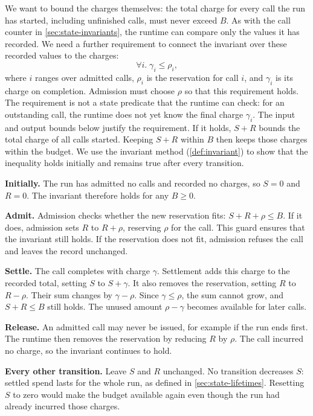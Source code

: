 We want to bound the charges themselves: the total charge for every call the run has started,
including unfinished calls, must never exceed $B$. As with the call counter in
\cref{sec:state-invariants}, the runtime can compare only the values it has recorded. We need a
further requirement to connect the invariant over these recorded values to the charges:
\[
  \forall i.\; \gamma_i \leq \rho_i ,
\]
where $i$ ranges over admitted calls, $\rho_i$ is the reservation for call $i$, and $\gamma_i$ is
its charge on completion. Admission must choose $\rho$ so that this requirement holds. The
requirement is not a state predicate that the runtime can check: for an outstanding call, the
runtime does not yet know the final charge $\gamma_i$. The input and output bounds below justify
the requirement. If it holds, $S + R$ bounds the total charge of all calls started. Keeping
$S + R$ within $B$ then keeps those charges within the budget. We use the invariant method
(\cref{def:invariant}) to show that the inequality holds initially and remains true after every
transition.

\bi

\item \textbf{Initially.} The run has admitted no calls and recorded no charges, so $S = 0$ and
$R = 0$. The invariant therefore holds for any $B \geq 0$.

\item \textbf{Admit.} Admission checks whether the new reservation fits: $S + R + \rho \leq B$.
If it does, admission sets $R$ to $R + \rho$, reserving $\rho$ for the call. This guard ensures
that the invariant still holds. If the reservation does not fit, admission refuses the call and
leaves the record unchanged.

\item \textbf{Settle.} The call completes with charge $\gamma$. Settlement adds this charge to
the recorded total, setting $S$ to $S + \gamma$. It also removes the reservation, setting $R$ to
$R - \rho$. Their sum changes by $\gamma - \rho$. Since $\gamma \leq \rho$, the sum cannot grow,
and $S + R \leq B$ still holds. The unused amount $\rho - \gamma$ becomes available for later
calls.

\item \textbf{Release.} An admitted call may never be issued, for example if the run ends first.
The runtime then removes the reservation by reducing $R$ by $\rho$. The call incurred no charge,
so the invariant continues to hold.

\item \textbf{Every other transition.} Leave $S$ and $R$ unchanged. No transition decreases $S$:
settled spend lasts for the whole run, as defined in \cref{sec:state-lifetimes}. Resetting $S$ to
zero would make the budget available again even though the run had already incurred those charges.

